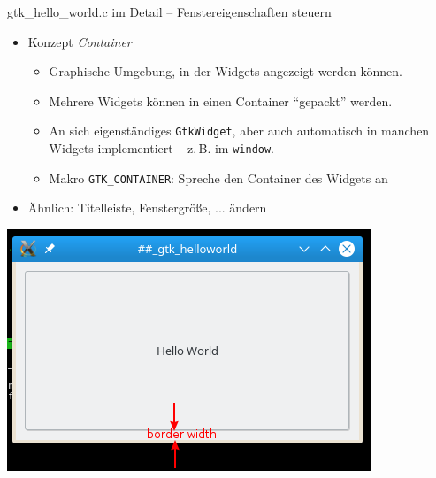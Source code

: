 \begin{frame}{gtk\_hello\_world.c im Detail -- Fenstereigenschaften steuern}
%

\vspace{3pt}
\begin{minipage}{.6\linewidth}
\begin{itemize}
\item Konzept \emph{Container}
	\begin{itemize}
	\item Graphische Umgebung, in der Widgets angezeigt werden können.
	\item Mehrere Widgets können in einen Container \enquote{gepackt} werden.
	\item An sich eigenständiges \texttt{GtkWidget}, aber auch automatisch in manchen Widgets
		implementiert -- z.\,B. im \texttt{window}.
	\item Makro \texttt{GTK\_CONTAINER}: Spreche den Container des Widgets an
	\end{itemize}
\item Ähnlich: Titelleiste, Fenstergröße, ... ändern
\end{itemize}
\end{minipage}
%
\begin{minipage}{.39\linewidth}
\includegraphics[width=\linewidth]{./gfx/gtkHelloWorld}
\end{minipage}
%
\end{frame}


